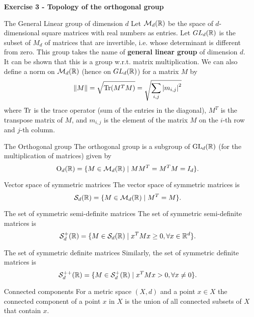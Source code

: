 \documentclass[12pt,a4paper]{article}
\begin{document}
\newpage
\noindent\textbf{Exercise 3 - Topology of the orthogonal group}\\
\begin{Definition}{The General Linear group of dimension $d$}{}
	Let $\mathcal M_d(\mathbb{R})$ be the space of $d$-dimensional square matrices with real numbers as entries. Let $GL_d(\mathbb{R})$ is the subset of $M_d$ of matrices that are invertible, i.e. whose determinant is different from zero. This group takes the name of \textbf{general linear group} of dimension $d$. It can be shown that this is a group w.r.t. matrix multiplication. We can also define a norm on $\mathcal M_d(\mathbb{R})$ (hence on $GL_d(\mathbb{R})$) for a matrix $M$ by
	$$\left\Vert M\right\Vert=\sqrt{\operatorname{Tr}(M^T M)}=\sqrt{\sum_{i,j} \left\vert m_{i,j}\right\vert^2}$$
	where $\operatorname{Tr}$ is the trace operator (sum of the entries in the diagonal), $M^T$ is the transpose matrix of $M$, and $m_{i,j}$ is the element of the matrix $M$ on the $i$-th row and $j$-th column.
\end{Definition}
\begin{Definition}{The Orthogonal group}{}
	The orthogonal group is a subgroup of $\operatorname{GL}_d(\mathbb{R})$ (for the multiplication of matrices) given by
	$$\operatorname{O}_d(\mathbb{R})=\{M\in \mathcal{M}_d(\mathbb{R}) \;|\; M M^T=M^T M=I_d\}.$$
\end{Definition}
\begin{Definition}{Vector space of symmetric matrices}{}
	The vector space of symmetric matrices is
	$$\mathcal{S}_d(\mathbb{R})=\{M\in \mathcal{M}_d(\mathbb{R})\;|\; M^T=M\}.$$
\end{Definition}
\begin{Definition}{The set of symmetric semi-definite matrices}{}
	The set of symmetric semi-definite matrices is
	$$\mathcal{S}_d^+(\mathbb{R})=\{M\in \mathcal{S}_d(\mathbb{R})\;|\; x^TMx\geq 0, \forall x\in \mathbb{R}^d\}.$$
\end{Definition}
\begin{Definition}{The set of symmetric definite matrices}{}
	Similarly, the set of symmetric definite matrices is
	$$\mathcal{S}_d^{++}(\mathbb{R})=\{M\in \mathcal{S}_d^+(\mathbb{R})\;|\; x^TMx> 0, \forall x\neq 0\}.$$
\end{Definition}
\begin{Definition}{Connected components}{}
	For a metric space $(X,d)$ and a point $x\in X$ the connected component of a point $x$ in $X$ is the union of all connected subsets of $X$ that contain $x$. 
\end{Definition}
\end{document}

